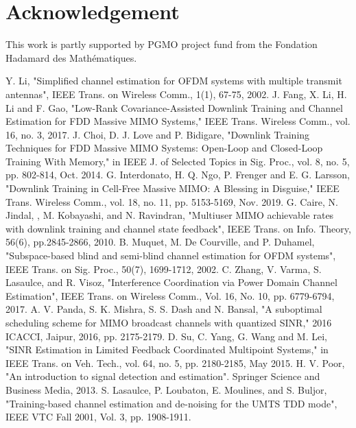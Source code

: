 \documentclass[francais]{gretsi}
\begin{document}
\section*{Acknowledgement}
This work is partly supported by PGMO project fund from the Fondation Hadamard des Math\'ematiques.


\begin{thebibliography}{10}
\footnotesize
{}
Y. Li, "Simplified channel estimation for OFDM systems with multiple transmit antennas", IEEE Trans. on Wireless Comm., 1(1), 67-75, 2002.
 J. Fang, X. Li, H. Li and F. Gao, "Low-Rank Covariance-Assisted Downlink Training and Channel Estimation for FDD Massive MIMO Systems," IEEE Trans. Wireless Comm., vol. 16, no. 3, 2017.
 J. Choi, D. J. Love and P. Bidigare, "Downlink Training Techniques for FDD Massive MIMO Systems: Open-Loop and Closed-Loop Training With Memory," in IEEE J. of Selected Topics in Sig. Proc., vol. 8, no. 5, pp. 802-814, Oct. 2014.
 G. Interdonato, H. Q. Ngo, P. Frenger and E. G. Larsson, "Downlink Training in Cell-Free Massive MIMO: A Blessing in Disguise," IEEE Trans.  Wireless Comm., vol. 18, no. 11, pp. 5153-5169, Nov. 2019.
G. Caire, N. Jindal, , M. Kobayashi,  and N. Ravindran, "Multiuser MIMO achievable rates with downlink training and channel state feedback", IEEE Trans. on Info. Theory, 56(6), pp.2845-2866, 2010.
B. Muquet, M. De Courville, and P.  Duhamel, "Subspace-based blind and semi-blind channel estimation for OFDM systems",  IEEE Trans. on Sig. Proc., 50(7), 1699-1712, 2002.
 C. Zhang, V. Varma, S. Lasaulce, and R. Visoz, "Interference Coordination via Power Domain Channel Estimation", IEEE Trans. on Wireless Comm., Vol. 16, No. 10, pp. 6779-6794, 2017.
 A. V. Panda, S. K. Mishra, S. S. Dash and N. Bansal, "A suboptimal scheduling scheme for MIMO broadcast channels with quantized SINR," 2016 ICACCI, Jaipur, 2016, pp. 2175-2179.  
 D. Su, C. Yang, G. Wang and M. Lei, "SINR Estimation in Limited Feedback Coordinated Multipoint Systems," in IEEE Trans. on Veh. Tech., vol. 64, no. 5, pp. 2180-2185, May 2015.
 H. V. Poor,  "An introduction to signal detection and estimation". Springer Science and Business Media, 2013.
 S. Lasaulce, P. Loubaton, E. Moulines, and S. Buljor, "Training-based channel estimation and de-noising for the UMTS TDD mode", IEEE VTC Fall 2001, Vol. 3, pp. 1908-1911.

\end{thebibliography}
\end{document}
